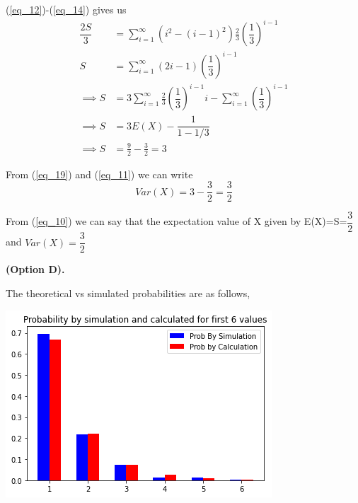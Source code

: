 \documentclass[a4paper]{article}
\begin{document}
\begin{multicols*}{2}
(\ref{eq_12})-(\ref{eq_14}) gives us
\begin{align}
\dfrac{2S}{3} & = \sum_{i=1}^{\infty} (i^2-(i-1)^2) \frac{2}{3}\left(\dfrac{1}{3}\right)^{i-1}\\
S &= \sum_{i=1}^{\infty} (2i-1)\left(\dfrac{1}{3}\right)^{i-1} \\
\implies S&= 3 \sum_{i=1}^{\infty} \frac{2}{3}\left(\dfrac{1}{3}\right)^{i-1}i-\sum_{i=1}^{\infty} \left(\dfrac{1}{3}\right)^{i-1} \\
\implies S&= 3E(X)-\dfrac{1}{1-1/3}\\
\implies S& = \frac{9}{2}-\frac{3}{2}=3 \label{eq_19}
\end{align}

From (\ref{eq_19}) and (\ref{eq_11}) we can write 
$$Var(X)=3-\frac{3}{2}=\frac{3}{2}$$

From (\ref{eq_10}) we can say that the expectation value of X given by E(X)=S=$\dfrac{3}{2}$		
and $Var(X)=\dfrac{3}{2}$  

\textbf{(Option D).}

\vspace{1 cm}


The theoretical vs simulated probabilities are as follows,\\

\begin{center}
\includegraphics[scale=0.5]{img-1}
\end{center}




\end{multicols*}
\end{document}
